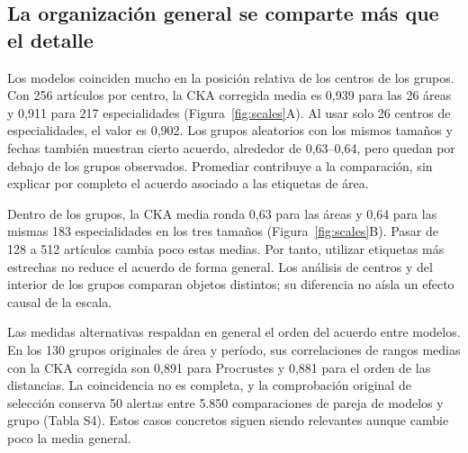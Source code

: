 \documentclass[12pt]{article}
\begin{document}
\subsection{La organización general se comparte más que el detalle}
Los modelos coinciden mucho en la posición relativa de los centros de los grupos. Con 256 artículos por centro, la CKA corregida media es 0,939 para las 26 áreas y 0,911 para 217 especialidades (Figura~\ref{fig:scales}A). Al usar solo 26 centros de especialidades, el valor es 0,902. Los grupos aleatorios con los mismos tamaños y fechas también muestran cierto acuerdo, alrededor de 0,63--0,64, pero quedan por debajo de los grupos observados. Promediar contribuye a la comparación, sin explicar por completo el acuerdo asociado a las etiquetas de área.

Dentro de los grupos, la CKA media ronda 0,63 para las áreas y 0,64 para las mismas 183 especialidades en los tres tamaños (Figura~\ref{fig:scales}B). Pasar de 128 a 512 artículos cambia poco estas medias. Por tanto, utilizar etiquetas más estrechas no reduce el acuerdo de forma general. Los análisis de centros y del interior de los grupos comparan objetos distintos; su diferencia no aísla un efecto causal de la escala.

Las medidas alternativas respaldan en general el orden del acuerdo entre modelos. En los 130 grupos originales de área y período, sus correlaciones de rangos medias con la CKA corregida son 0,891 para Procrustes y 0,881 para el orden de las distancias. La coincidencia no es completa, y la comprobación original de selección conserva 50 alertas entre 5.850 comparaciones de pareja de modelos y grupo (Tabla S4). Estos casos concretos siguen siendo relevantes aunque cambie poco la media general.
\end{document}
